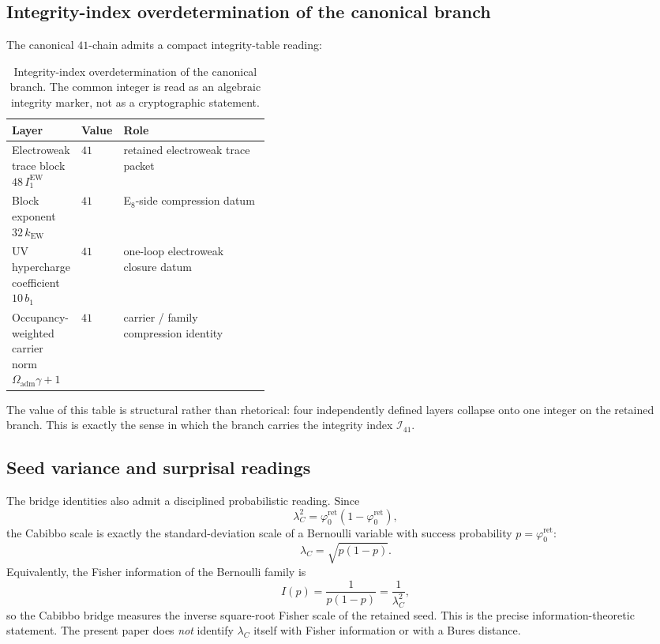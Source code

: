 \documentclass[11pt,a4paper]{article}
\theoremstyle{definition}
\theoremstyle{remark}
\newcommand{\phiz}{\varphi_0^{\mathrm{ret}}}
\newcommand{\Oadm}{\Omega_{\mathrm{adm}}}
\begin{document}
\subsection{Integrity-index overdetermination of the canonical branch}

The canonical $41$-chain admits a compact integrity-table reading:

\begin{table}[H]
\centering
\small
\begin{tabularx}{\linewidth}{@{}>{\raggedright\arraybackslash}p{0.26\linewidth}>{\raggedleft\arraybackslash}p{0.12\linewidth}Y@{}}
\toprule
Layer & Value & Role \\
\midrule
Electroweak trace block $48\,I_1^{\mathrm{EW}}$ & $41$ & retained electroweak trace packet \\
Block exponent $32\,k_{\mathrm{EW}}$ & $41$ & E$_8$-side compression datum \\
UV hypercharge coefficient $10\,b_1$ & $41$ & one-loop electroweak closure datum \\
Occupancy-weighted carrier norm $\Oadm\gamma+1$ & $41$ & carrier / family compression identity \\
\bottomrule
\end{tabularx}
\caption{Integrity-index overdetermination of the canonical branch. The common integer is read as an algebraic integrity marker, not as a cryptographic statement.}
\label{tab:checksum-41}
\end{table}

The value of this table is structural rather than rhetorical: four independently defined layers collapse onto one integer on the retained branch. This is exactly the sense in which the branch carries the integrity index $\mathcal I_{41}$.

\subsection{Seed variance and surprisal readings}

The bridge identities also admit a disciplined probabilistic reading. Since
\[
\lambda_C^2=\phiz(1-\phiz),
\]
the Cabibbo scale is exactly the standard-deviation scale of a Bernoulli variable with success probability $p=\phiz$:
\[
\lambda_C=\sqrt{p(1-p)}.
\]
Equivalently, the Fisher information of the Bernoulli family is
\[
I(p)=\frac{1}{p(1-p)}=\frac{1}{\lambda_C^2},
\]
so the Cabibbo bridge measures the inverse square-root Fisher scale of the retained seed. This is the precise information-theoretic statement. The present paper does \emph{not} identify $\lambda_C$ itself with Fisher information or with a Bures distance.
\end{document}
